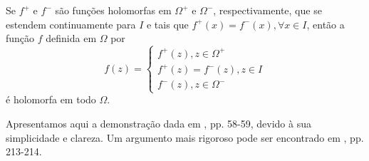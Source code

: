 \begin{teorema}
\label{teo-principio-simetria}
Se $f^+$ e $f^-$ são funções holomorfas em $\Omega^+$ e $\Omega^-$, respectivamente,
que se estendem continuamente para $I$ e tais que $f^+(x) = f^-(x), \forall x\in I$,
então a função $f$ definida em $\Omega$ por
\begin{equation*}
    f(z) = \begin{cases}
    f^+(z), z\in\Omega^+ \\
    f^+(z) = f^-(z), z\in I \\
    f^-(z), z\in\Omega^-
    \end{cases}
\end{equation*}
é holomorfa em todo $\Omega$.
\end{teorema}

Apresentamos aqui a demonstração dada em \cite{MR1976398}, pp. 58-59, 
devido à sua simplicidade e clareza. Um argumento mais rigoroso pode ser 
encontrado em \cite{MR503901}, pp. 213-214.

